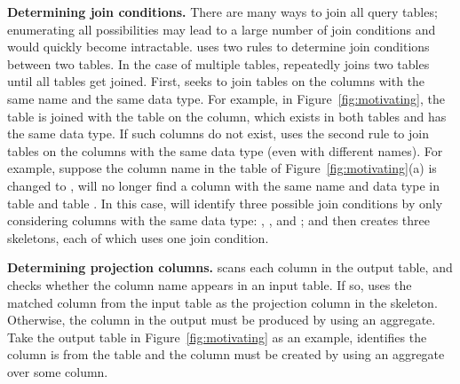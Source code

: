 \vspace{1mm}
{\textbf{Determining join conditions. }} There
are many ways to join all query tables; enumerating
all possibilities may lead to a large number of
join conditions and would quickly
become intractable. \ourtool uses
two rules to determine join conditions between two tables.
In the case of
multiple tables, \ourtool repeatedly joins
two tables until all tables get joined.
First, \ourtool seeks to join
tables on the columns with the
same name and the same data type. For example,
in Figure~\ref{fig:motivating}, the  table
is joined with the  table on the
 column, which exists in both
tables and has the same data type.
If such columns do not exist,
\ourtool uses the second rule to
join tables on the columns with the same data type
(even with different names).
For example, suppose the column name 
in the  table of Figure~\ref{fig:motivating}(a)
is changed to , \ourtool will no longer
find a column with the same name and data type in
table  and table . In this case,
\ourtool will identify three possible join conditions
by only considering columns with the same data type:
, ,
and ; and then creates 
three skeletons, each of which uses one join condition. 

{\textbf{Determining projection columns.}} \ourtool
scans each column in the output table, and checks whether
the column name appears in an input table.
If so, \ourtool uses the matched column from the input
table as the projection column in the skeleton.
Otherwise, the column in the output must be produced by using an aggregate.
Take the output table in Figure~\ref{fig:motivating} as an
example, \ourtool identifies the  column
is from the  table and
the  column must be created by using
an aggregate over some column.





